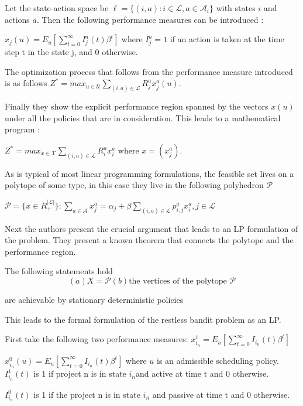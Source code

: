 Let the state-action space be  $\ell= \{(i,a): i \in \mathcal{L}, a \in  \mathcal{A}_i \}$
with states $i$ and actions $a$. Then the following performance measures can be introduced :

$x_j(u) = E_u[\sum_{t=0}^{\infty}I_j^a(t) \beta^t]$ where $I_j^a = 1$ if an action is taken at the time step t in the state j, and 0 otherwise. 

The optimization process that follows from the performance measure introduced is as follows 
$Z^* = max_{u \in \mathcal{U}} \sum_{(i,a) \in \mathcal{L}} R_j^a x_j^a(u)$.  

Finally they show the explicit performance region spanned by the vectors $x(u)$ under all the policies that are in consideration. This leads to a mathematical program : 

$Z^* = max_{x \in \mathcal{X}}\sum_{(i,a)\in \mathcal{L}}R_i^a x_i^a$ where $x = (x_j^a)$. 

As is typical of most linear programming formulations, the feasible set lives on a polytope of some type, in this case they live in the following polyhedron $\mathcal {P}$ 

$\mathcal{P} = \{ x \in R_+^{|\mathcal{L}|} \}: \sum_{a \in \mathcal{A}} x_j^a = \alpha_j 
+ \beta \sum_{(i,a) \in \mathcal{L}} p_{i,j}^a x_i^a, j  \in \mathcal{L}$ 

Next the authors present the crucial argument that leads to an LP formulation of the problem.
They present a known theorem that connects the polytope and the performance region.

The following statements hold
\begin{equation}
(a) X = \mathcal{P}
(b)\text{the vertices of the polytope } \mathcal{P}
\end{equation} 

are achievable by stationary deterministic policies

This leads to the formal formulation of the restless bandit problem as an LP.

First take the following two performance measures:
$x_{i_n}^1 = E_u[\sum_{t=0}^{\infty} I_{i_n}(t)\beta^t]$ 

$x_{i_n}^0(u) = E_u[\sum_{t=0}^{\infty}I_{i_n}(t) \beta^t]$ where $u$ is an admissible scheduling policy.  \\

$I_{i_n}^1(t)$ is 1 if project n is in state $i_n$and active at time t and 0 otherwise.

$I_{i_n}^0(t)$ is 1 if the project n is in state $i_n$ and passive at time t and 0 otherwise.

